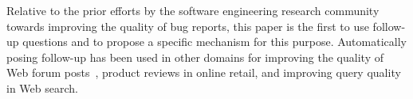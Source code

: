 Relative to the prior efforts by the software engineering research community towards improving the quality of bug reports, this paper is the first to use follow-up questions and to propose a specific mechanism for this purpose. Automatically posing follow-up has been used in other domains for improving the quality of Web forum posts~\cite{rao-daume-iii-2018-learning}, product reviews in online retail, and improving query quality in Web search.

%
